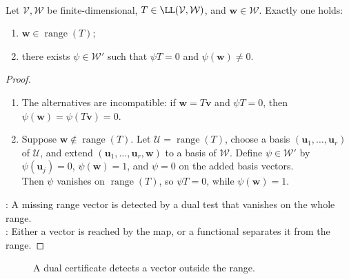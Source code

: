 \begin{theorem} \label{thm:range-membership-dual-alternative} \\
Let $\mathcal{V},\mathcal{W}$ be finite-dimensional, $T\in\LL(\mathcal{V},\mathcal{W})$, and $\mathbf{w}\in\mathcal{W}$. Exactly one holds:
\begin{enumerate}[label=(\roman*)]
\setlength{\itemsep}{0pt}
\item $\mathbf{w}\in\operatorname{range}(T)$;
\item there exists $\psi\in\mathcal{W}'$ such that $\psi T=0$ and $\psi(\mathbf{w})\neq0$.
\end{enumerate}
\begin{proof}
\begin{enumerate}[label=(\roman*)]
\setlength{\itemsep}{0pt}
\item The alternatives are incompatible: if $\mathbf{w}=T\mathbf{v}$ and $\psi T=0$, then $\psi(\mathbf{w})=\psi(T\mathbf{v})=0$.
\item Suppose $\mathbf{w}\notin\operatorname{range}(T)$. Let $\mathcal{U}=\operatorname{range}(T)$, choose a basis $(\mathbf{u}_1,\ldots,\mathbf{u}_r)$ of $\mathcal{U}$, and extend $(\mathbf{u}_1,\ldots,\mathbf{u}_r,\mathbf{w})$ to a basis of $\mathcal{W}$. Define $\psi\in\mathcal{W}'$ by $\psi(\mathbf{u}_j)=0$, $\psi(\mathbf{w})=1$, and $\psi=0$ on the added basis vectors.\\
Then $\psi$ vanishes on $\operatorname{range}(T)$, so $\psi T=0$, while $\psi(\mathbf{w})=1$.
\end{enumerate}
: A missing range vector is detected by a dual test that vanishes on the whole range.\\
: Either a vector is reached by the map, or a functional separates it from the range.
\end{proof}
\end{theorem}

\begin{figure}[H]
  \centering
  
  \caption{A dual certificate detects a vector outside the range.}
  \label{fig:range-membership-dual-certificate}
\end{figure}

